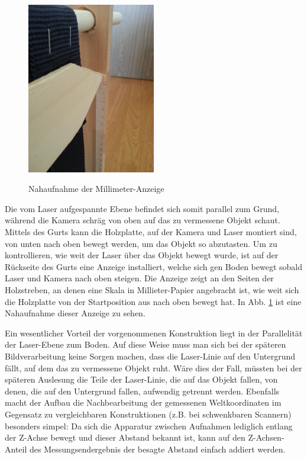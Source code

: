 \begin{figure}
\centering \includegraphics[width=0.5\textwidth, angle = -90]{images/Scanner3.jpg}
\label{fig:scanner3}
\caption{Nahaufnahme der Millimeter-Anzeige}
\end{figure}

Die vom Laser aufgespannte Ebene befindet sich somit parallel zum Grund, während die Kamera schräg von oben auf das zu vermessene Objekt schaut. Mittels des Gurts kann die Holzplatte, auf der Kamera und Laser montiert sind, von unten nach oben bewegt werden, um das Objekt so abzutasten. Um zu kontrollieren, wie weit der Laser über das Objekt bewegt wurde, ist auf der Rückseite des Gurts eine Anzeige installiert, welche sich gen Boden bewegt sobald Laser und Kamera nach oben steigen. Die Anzeige zeigt an den Seiten der Holzstreben, an denen eine Skala in Millieter-Papier angebracht ist, wie weit sich die Holzplatte von der Startposition aus nach oben bewegt hat. In Abb. \ref{fig:scanner3} ist eine Nahaufnahme dieser Anzeige zu sehen.

Ein wesentlicher Vorteil der vorgenommenen Konstruktion liegt in der Parallelität der Laser-Ebene zum Boden. Auf diese Weise muss man sich bei der späteren Bildverarbeitung keine Sorgen machen, dass die Laser-Linie auf den Untergrund fällt, auf dem das zu vermessene Objekt ruht. Wäre dies der Fall, müssten bei der späteren Auslesung die Teile der Laser-Linie, die auf das Objekt fallen, von denen, die auf den Untergrund fallen, aufwendig getrennt werden. Ebenfalls macht der Aufbau die Nachbearbeitung der gemessenen Weltkoordinaten im Gegensatz zu vergleichbaren Konstruktionen (z.B. bei schwenkbaren Scannern) besonders simpel: Da sich die Apparatur zwischen Aufnahmen lediglich entlang der Z-Achse bewegt und dieser Abstand bekannt ist, kann auf den Z-Achsen-Anteil des Messungsendergebnis der besagte Abstand einfach addiert werden.

